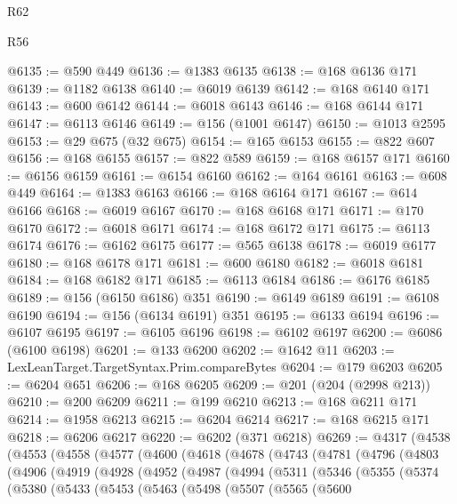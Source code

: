 \begin{lexlean}{R62}
\begin{lexlean}{R56}
\begin{coremodule}
{{{{{{{{{{{{{{{{{{{{{{{{{{{{{{{{{{{{{{{{{{{{{{{{{{{{{{{{{{{{{{{{{{{{{{{{{{{{{{{{{{{{{{{{{{{{{{{{{{{{{{{{{{{{{{{{{{{{{{{{{{{{{{{{{{{{{{{{{{{{{{{{{{{{{{{{{{{{{{{{{{{{{{{{{{{{{{{{{{{{{{{{{{{{{{{{{{{{{{{{{{{{{{{{{{{@6135 := @590 @449
@6136 := @1383 @6135
@6138 := @168 @6136 @171
@6139 := @1182 @6138
@6140 := @6019 @6139
@6142 := @168 @6140 @171
@6143 := @600 @6142
@6144 := @6018 @6143
@6146 := @168 @6144 @171
@6147 := @6113 @6146
@6149 := @156 (@1001 @6147)
@6150 := @1013 @2595
@6153 := @29 @675 (@32 @675)
@6154 := @165 @6153
@6155 := @822 @607
@6156 := @168 @6155
@6157 := @822 @589
@6159 := @168 @6157 @171
@6160 := @6156 @6159
@6161 := @6154 @6160
@6162 := @164 @6161
@6163 := @608 @449
@6164 := @1383 @6163
@6166 := @168 @6164 @171
@6167 := @614 @6166
@6168 := @6019 @6167
@6170 := @168 @6168 @171
@6171 := @170 @6170
@6172 := @6018 @6171
@6174 := @168 @6172 @171
@6175 := @6113 @6174
@6176 := @6162 @6175
@6177 := @565 @6138
@6178 := @6019 @6177
@6180 := @168 @6178 @171
@6181 := @600 @6180
@6182 := @6018 @6181
@6184 := @168 @6182 @171
@6185 := @6113 @6184
@6186 := @6176 @6185
@6189 := @156 (@6150 @6186) @351
@6190 := @6149 @6189
@6191 := @6108 @6190
@6194 := @156 (@6134 @6191) @351
@6195 := @6133 @6194
@6196 := @6107 @6195
@6197 := @6105 @6196
@6198 := @6102 @6197
@6200 := @6086 (@6100 @6198)
@6201 := @133 @6200
@6202 := @1642 @11
@6203 := LexLeanTarget.TargetSyntax.Prim.compareBytes
@6204 := @179 @6203
@6205 := @6204 @651
@6206 := @168 @6205
@6209 := @201 (@204 (@2998 @213))
@6210 := @200 @6209
@6211 := @199 @6210
@6213 := @168 @6211 @171
@6214 := @1958 @6213
@6215 := @6204 @6214
@6217 := @168 @6215 @171
@6218 := @6206 @6217
@6220 := @6202 (@371 @6218)
@6269 := @4317
    (@4538
      (@4553
        (@4558
          (@4577
            (@4600
              (@4618
                (@4678
                  (@4743
                    (@4781
                      (@4796
                        (@4803
                          (@4906
                            (@4919
                              (@4928
                                (@4952
                                  (@4987
                                    (@4994
                                      (@5311
                                        (@5346
                                          (@5355
                                            (@5374
                                              (@5380
                                                (@5433
                                                  (@5453
                                                    (@5463
                                                      (@5498
                                                        (@5507
                                                          (@5565
                                                            (@5600
}}}}}}}}}}}}}}}}}}}}}}}}}}}}}}}}}}}}}}}}}}}}}}}}}}}}}}}}}}}}}}}}}}}}}}}}}}}}}}}}}}}}}}}}}}}}}}}}}}}}}}}}}}}}}}}}}}}}}}}}}}}}}}}}}}}}}}}}}}}}}}}}}}}}}}}}}}}}}}}}}}}}}}}}}}}}}}}}}}}}}}}}}}}}}}}}}}}}}}}}}}}}}}}}}}}
\end{coremodule}
\end{lexlean}
\end{lexlean}
